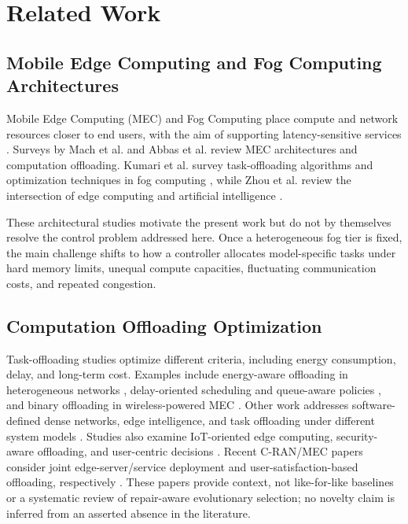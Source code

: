 \documentclass[pdflatex,sn-mathphys-num]{sn-jnl}
\begin{document}


\section{Related Work}

\subsection{Mobile Edge Computing and Fog Computing Architectures}
Mobile Edge Computing (MEC) and Fog Computing place compute and network resources closer to end users, with the aim of supporting latency-sensitive services \cite{Mao2017, Shi2016}. Surveys by Mach et al. \cite{Mach2017} and Abbas et al. \cite{Abbas2018} review MEC architectures and computation offloading. Kumari et al. survey task-offloading algorithms and optimization techniques in fog computing \cite{Kumari2022}, while Zhou et al. review the intersection of edge computing and artificial intelligence \cite{Zhou2019}.

These architectural studies motivate the present work but do not by themselves resolve the control problem addressed here. Once a heterogeneous fog tier is fixed, the main challenge shifts to how a controller allocates model-specific tasks under hard memory limits, unequal compute capacities, fluctuating communication costs, and repeated congestion.

\subsection{Computation Offloading Optimization}
Task-offloading studies optimize different criteria, including energy consumption, delay, and long-term cost. Examples include energy-aware offloading in heterogeneous networks \cite{Zhang2016, You2017}, delay-oriented scheduling and queue-aware policies \cite{Liu2016, Meng2019}, and binary offloading in wireless-powered MEC \cite{Bi2018}. Other work addresses software-defined dense networks, edge intelligence, and task offloading under different system models \cite{Chen2018, Zhou2019, Deng2020}. Studies also examine IoT-oriented edge computing, security-aware offloading, and user-centric decisions \cite{Sun2016, Premsankar2018, Samy2022, Deng2021}. Recent C-RAN/MEC papers consider joint edge-server/service deployment and user-satisfaction-based offloading, respectively \cite{pan2024joint,yang2024satisfaction}. These papers provide context, not like-for-like baselines or a systematic review of repair-aware evolutionary selection; no novelty claim is inferred from an asserted absence in the literature.
\end{document}

